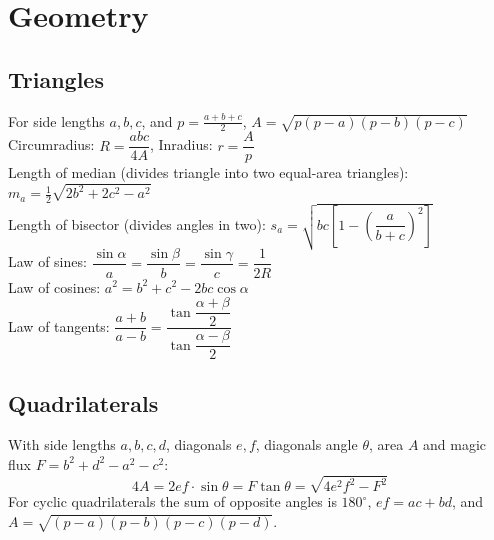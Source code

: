 \section{Geometry}

\subsection{Triangles}
For side lengths $a,b,c$, and $p = \frac{a+b+c}{2}$, $A=\sqrt{p(p-a)(p-b)(p-c)}$\\
Circumradius: $R=\dfrac{abc}{4A}$, Inradius: $r=\dfrac{A}{p}$\\
Length of median (divides triangle into two equal-area triangles): $m_a=\tfrac{1}{2}\sqrt{2b^2+2c^2-a^2}$\\
Length of bisector (divides angles in two): $s_a=\sqrt{bc\left[1-\left(\dfrac{a}{b+c}\right)^2\right]}$\\
Law of sines: $\dfrac{\sin\alpha}{a}=\dfrac{\sin\beta}{b}=\dfrac{\sin\gamma}{c}=\dfrac{1}{2R}$\\
Law of cosines: $a^2=b^2+c^2-2bc\cos\alpha$\\
Law of tangents: $\dfrac{a+b}{a-b}=\dfrac{\tan\dfrac{\alpha+\beta}{2}}{\tan\dfrac{\alpha-\beta}{2}}$\\

\subsection{Quadrilaterals}
With side lengths $a,b,c,d$, diagonals $e, f$, diagonals angle $\theta$, area $A$ and
magic flux $F=b^2+d^2-a^2-c^2$:
\[ 4A = 2ef \cdot \sin\theta = F\tan\theta = \sqrt{4e^2f^2-F^2} \]
For cyclic quadrilaterals the sum of opposite angles is $180^\circ$,
$ef = ac + bd$, and $A = \sqrt{(p-a)(p-b)(p-c)(p-d)}$.


